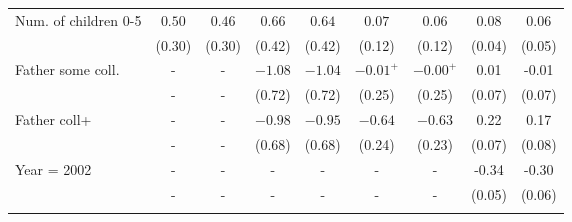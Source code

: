 \begin{tabular}{lcccccccc}
Num. of children 0-5&$0.50$&$0.46$&$0.66$&$0.64$&$0.07$&$0.06$&0.08&0.06\\
&(0.30)&(0.30)&(0.42)&(0.42)&(0.12)&(0.12)&(0.04)&(0.05)\\
Father some coll.&-&-&$-1.08$&$-1.04$&$-0.01^{+}$&$-0.00^{+}$&0.01&-0.01\\
&-&-&(0.72)&(0.72)&(0.25)&(0.25)&(0.07)&(0.07)\\
Father coll+&-&-&$-0.98$&$-0.95$&$-0.64$&$-0.63$&0.22&0.17\\
&-&-&(0.68)&(0.68)&(0.24)&(0.23)&(0.07)&(0.08)\\
Year = 2002&-&-&-&-&-&-&-0.34&-0.30\\
&-&-&-&-&-&-&(0.05)&(0.06)\\
\\
\bottomrule\end{tabular}